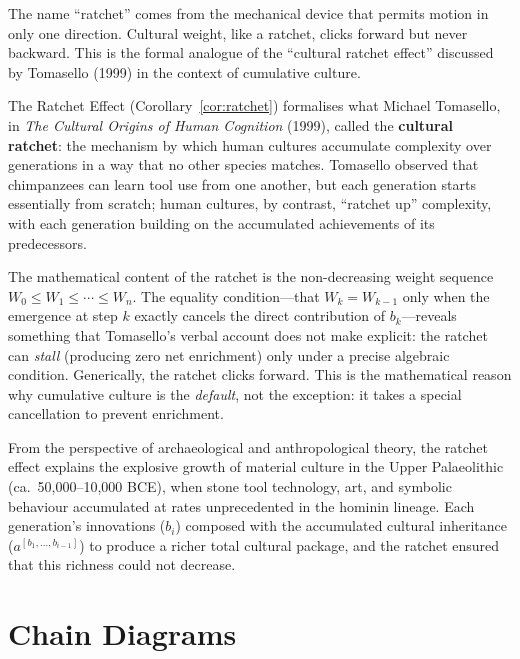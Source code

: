 \begin{remark}
The name ``ratchet'' comes from the mechanical device that permits motion in
only one direction.  Cultural weight, like a ratchet, clicks forward but
never backward.  This is the formal analogue of the ``cultural ratchet
effect'' discussed by Tomasello (1999) in the context of cumulative culture.
\end{remark}

\begin{interpretation}
\label{interp:ch8:tomasello_ratchet}
The Ratchet Effect (Corollary~\ref{cor:ratchet}) formalises what Michael
Tomasello, in \emph{The Cultural Origins of Human Cognition} (1999), called
the \textbf{cultural ratchet}: the mechanism by which human cultures
accumulate complexity over generations in a way that no other species matches.
Tomasello observed that chimpanzees can learn tool use from one another, but
each generation starts essentially from scratch; human cultures, by contrast,
``ratchet up'' complexity, with each generation building on the accumulated
achievements of its predecessors.

The mathematical content of the ratchet is the non-decreasing weight sequence
$W_0 \leq W_1 \leq \cdots \leq W_n$.  The equality condition---that $W_k =
W_{k-1}$ only when the emergence at step $k$ exactly cancels the direct
contribution of $b_k$---reveals something that Tomasello's verbal account
does not make explicit: the ratchet can \emph{stall} (producing zero net
enrichment) only under a precise algebraic condition.  Generically, the
ratchet clicks forward.  This is the mathematical reason why cumulative
culture is the \emph{default}, not the exception: it takes a special
cancellation to prevent enrichment.

From the perspective of archaeological and anthropological theory, the
ratchet effect explains the explosive growth of material culture in the
Upper Palaeolithic (ca.\ 50,000--10,000 BCE), when stone tool technology,
art, and symbolic behaviour accumulated at rates unprecedented in the
hominin lineage.  Each generation's innovations ($b_i$) composed with the
accumulated cultural inheritance ($a^{[b_1,\ldots,b_{i-1}]}$) to produce a
richer total cultural package, and the ratchet ensured that this richness
could not decrease.
\end{interpretation}



\section{Chain Diagrams}

